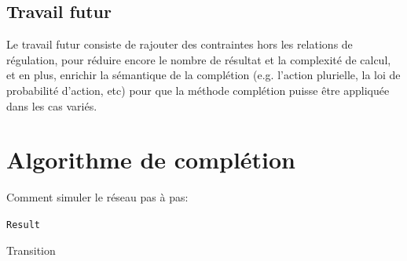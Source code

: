 \documentclass[11pt]{report}
\theoremstyle{definition}
\begin{document}
\section{Travail futur}
Le travail futur consiste de rajouter des contraintes hors les relations de r\'egulation, pour r\'eduire encore le nombre de r\'esultat et la complexit\'e de calcul, et en plus, enrichir la s\'emantique de la compl\'etion (e.g. l'action plurielle, la loi de probabilit\'e d'action, etc) pour que la m\'ethode compl\'etion puisse \^etre appliqu\'ee dans les cas vari\'es.

\renewcommand\bibname{R\'ef\'erences}


\appendix
\chapter{Algorithme de compl\'etion}
Comment simuler le r\'eseau pas \`a pas:\\
\begin{algorithm}[ht]
 \Return \texttt{Result}
 \caption{\label{a1}Transition}
\end{algorithm}
\clearpage
\end{document}
